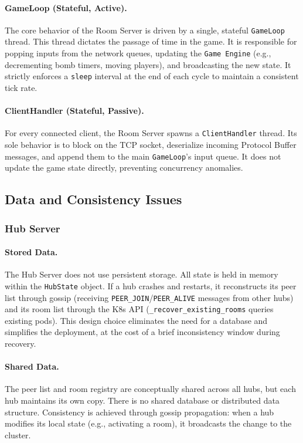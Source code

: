 \paragraph{GameLoop (Stateful, Active).}
The core behavior of the Room Server is driven by a single, stateful \texttt{GameLoop} thread. 
This thread dictates the passage of time in the game. It is responsible for popping inputs from the network queues, updating the \texttt{Game Engine} (e.g., decrementing bomb timers, moving players), and broadcasting the new state. It strictly enforces a \texttt{sleep} interval at the end of each cycle to maintain a consistent tick rate.

\paragraph{ClientHandler (Stateful, Passive).}
For every connected client, the Room Server spawns a \texttt{ClientHandler} thread. 
Its sole behavior is to block on the TCP socket, deserialize incoming Protocol Buffer messages, and append them to the main \texttt{GameLoop}'s input queue. 
It does not update the game state directly, preventing concurrency anomalies.

\subsection{Data and Consistency Issues}\label{data-and-consistency-issues}

\subsubsection{Hub Server}

\paragraph{Stored Data.}
The Hub Server does not use persistent storage.
All state is held in memory within the \texttt{HubState} object.
If a hub crashes and restarts, it reconstructs its peer list through gossip (receiving \texttt{PEER\_JOIN}/\texttt{PEER\_ALIVE} messages from other hubs) and its room list through the K8s API (\texttt{\_recover\_existing\_rooms} queries existing pods).
This design choice eliminates the need for a database and simplifies the deployment, at the cost of a brief inconsistency window during recovery.

\paragraph{Shared Data.}
The peer list and room registry are conceptually shared across all hubs, but each hub maintains its own copy.
There is no shared database or distributed data structure.
Consistency is achieved through gossip propagation: when a hub modifies its local state (e.g., activating a room), it broadcasts the change to the cluster.

